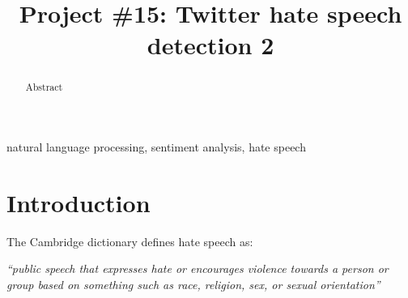 \documentclass[conference]{IEEEtran}
\begin{document}
\title{Project \#15: Twitter hate speech detection 2\\
}

\author{
\and
{}
\and
{}
\and
{}
}

\maketitle

\begin{abstract}
Abstract
\end{abstract}

\begin{IEEEkeywords}
natural language processing, sentiment analysis, hate speech
\end{IEEEkeywords}

\section{Introduction}
The Cambridge dictionary defines hate speech as:
\vspace{12pt}

\emph{``public speech that expresses hate or encourages violence towards a person or group based on something
such as race, religion, sex, or sexual orientation''} \cite{Cambridge:hate_speech}
\vspace{12pt}
\end{document}
